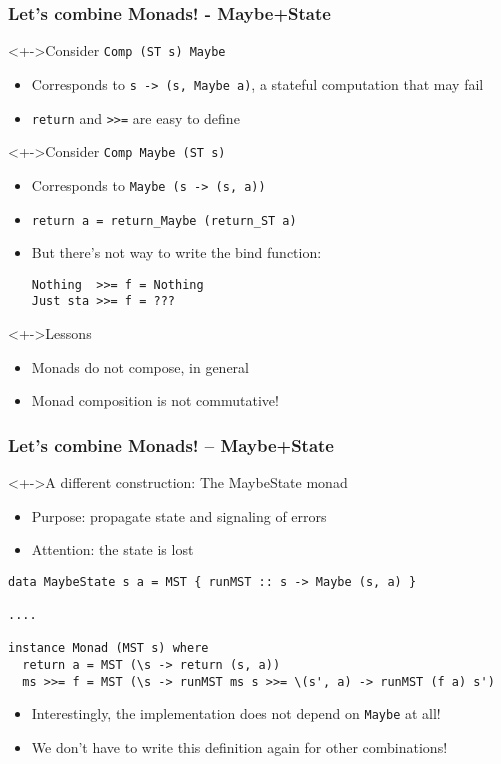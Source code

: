 \documentclass[pdftex,aspectratio=169]{beamer}
\begin{document}
\begin{frame}[fragile]
  \frametitle{Let's combine Monads! - Maybe+State}
  \begin{block}<+->{Consider  \lstinline{Comp (ST s) Maybe}}
    \begin{itemize}
    \item Corresponds to \lstinline{s -> (s, Maybe a)}, a stateful
      computation that may fail
    \item \lstinline{return} and \lstinline{>>=} are easy to define
    \end{itemize}
  \end{block}
  \begin{block}<+->{Consider \lstinline{Comp Maybe (ST s)}}
  \begin{itemize}
  \item Corresponds to \lstinline{Maybe (s -> (s, a))} 
    \item \lstinline{return a = return_Maybe (return_ST a)}
    \item But there's not way to write the bind function:
\begin{lstlisting}
Nothing  >>= f = Nothing
Just sta >>= f = ???
\end{lstlisting}
  \end{itemize}
\end{block}
\begin{block}<+->{Lessons}
  \begin{itemize}
  \item Monads do not compose, in general
  \item Monad composition is not commutative!
  \end{itemize}
\end{block}
\end{frame}


\begin{frame}[fragile]
  \frametitle{Let's combine Monads! -- Maybe+State}
  \begin{block}<+->{A different construction: The MaybeState monad}
    \begin{itemize}
    \item Purpose: propagate state and signaling of errors
    \item Attention: the state is lost
    \end{itemize}
      \begin{lstlisting}
data MaybeState s a = MST { runMST :: s -> Maybe (s, a) }

....

instance Monad (MST s) where
  return a = MST (\s -> return (s, a))
  ms >>= f = MST (\s -> runMST ms s >>= \(s', a) -> runMST (f a) s')
      \end{lstlisting}
  \end{block}
  \begin{itemize}
  \item<+->     Interestingly, the implementation does not depend 
    on \lstinline{Maybe} at all! 
  \item<+->     We don't have to write this definition again for other combinations! 
  \end{itemize}
\end{frame}
\end{document}
